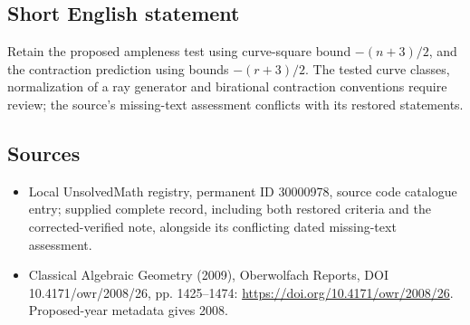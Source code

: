 \documentclass[11pt]{article}
\begin{document}
\subsection{Short English statement}
Retain the proposed ampleness test using curve-square bound $-(n+3)/2$, and the contraction prediction using bounds $-(r+3)/2$. The tested curve classes, normalization of a ray generator and birational contraction conventions require review; the source's missing-text assessment conflicts with its restored statements.
\subsection{Sources}
\begin{itemize}
\item Local UnsolvedMath registry, permanent ID 30000978, source code catalogue entry; supplied complete record, including both restored criteria and the corrected-verified note, alongside its conflicting dated missing-text assessment.
\item Classical Algebraic Geometry (2009), Oberwolfach Reports, DOI 10.4171/owr/2008/26, pp. 1425--1474: \url{https://doi.org/10.4171/owr/2008/26}. Proposed-year metadata gives 2008.
\end{itemize}
\end{document}
